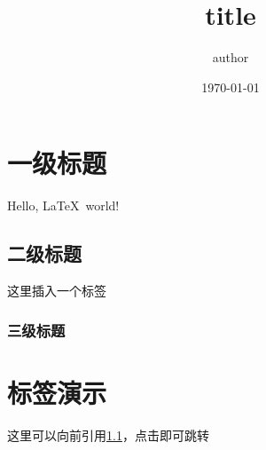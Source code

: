 \documentclass[12pt]{ctexart}
\title{title}
\author{author}
\date{\today}
\begin{document}
\maketitle
\newpage
{}
\setcounter{page}{1}
\tableofcontents
\newpage
{}
\section{一级标题}
Hello, \LaTeX\ world!
\subsection{二级标题}
\label{sec1} 这里插入一个标签
\subsubsection{三级标题}  
\section{标签演示}
这里可以向前引用\ref{sec1}，点击即可跳转
\end{document}

